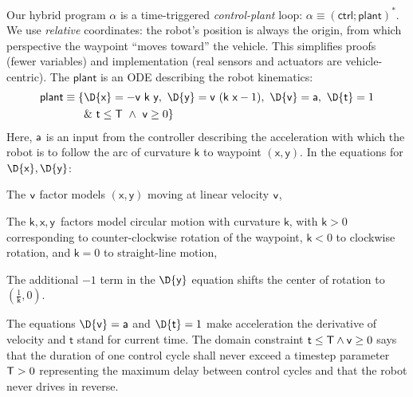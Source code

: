 \documentclass[12pt]{cmuthesis}
\theoremstyle{definition}
\theoremstyle{remark}
\newcommand{\xgvar}{\textsf{x}}
\newcommand{\ygvar}{\textsf{y}}
\newcommand{\kvar}{\textsf{k}}
\newcommand{\tvar}{\textsf{t}}
\newcommand{\Tvar}{{\sf T}\xspace}
\newcommand{\vvar}{{\sf v}\xspace}
\newcommand{\avar}{{\sf a}\xspace}
\newcommand{\ctrl}{\textsf{ctrl}\xspace}
\newcommand{\plant}{\textsf{plant}\xspace}
\begin{document}
Our hybrid program $\alpha$ is a time-triggered \emph{control-plant} loop: $\alpha\equiv(\ctrl;\plant)^*$.
We use \emph{relative} coordinates: the robot's position is always the origin, from which perspective the waypoint ``moves toward'' the vehicle.
This simplifies proofs (fewer variables) and implementation (real sensors and actuators are vehicle-centric).
The $\plant$ is an ODE describing the robot kinematics:
\begin{align*}
\plant\equiv \{&\D{\xgvar}=-\vvar~\kvar~\ygvar,~\D{\ygvar}=\vvar~(\kvar~\xgvar-1),~\D{\vvar}=\avar,~\D{\tvar}=1 \\
 &\&~\tvar\leq \Tvar ~\land~ \vvar \geq 0\} %
\end{align*}
Here, $\avar$ is an input from the controller describing the acceleration with which the robot is to follow the arc of curvature $\kvar$ to waypoint $(\xgvar,\ygvar)$.
In the equations for $\D{\xgvar},\D{\ygvar}$: \begin{inparaenum}[\it i)]\item The $\vvar$ factor models $(\xgvar,\ygvar)$ moving at linear velocity $\vvar$, \item The $\kvar,\xgvar,\ygvar$\ factors model circular motion with curvature $\kvar$, with $\kvar > 0$ corresponding to counter-clockwise rotation of the waypoint, $\kvar < 0$ to clockwise rotation, and $\kvar = 0$ to straight-line motion, \item The additional $-1$ term in the $\D{\ygvar}$ equation shifts the center of rotation to $\left(\frac{1}{\kvar},0\right)$.
\end{inparaenum}
The equations $\D{\vvar}=\avar$ and $\D{\tvar}=1$ make acceleration the derivative of velocity and $\tvar$ stand for current time.
The domain constraint $\tvar \leq \Tvar \land \vvar \geq 0$ says that the duration of one control cycle shall never exceed a timestep parameter $\Tvar > 0$ representing the maximum delay between control cycles and that the robot never drives in reverse.
\end{document}
